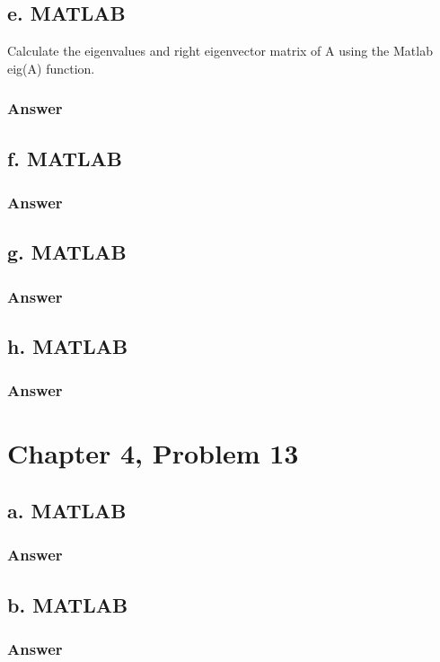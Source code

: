 \documentclass{article}
\begin{document}
		\subsection{e. MATLAB}
		
		Calculate the eigenvalues and right eigenvector matrix of A using the Matlab eig(A) function.  
		\subsubsection{Answer}
		
		\subsection{f. MATLAB}
		\subsubsection{Answer}
		
		\subsection{g. MATLAB}
		\subsubsection{Answer}
		
		\subsection{h. MATLAB}
		\subsubsection{Answer}
		
	\section{Chapter 4, Problem 13}
		\subsection{a. MATLAB}
			\subsubsection{Answer}
			
		\subsection{b. MATLAB}
			\subsubsection{Answer}
	
\end{document}
